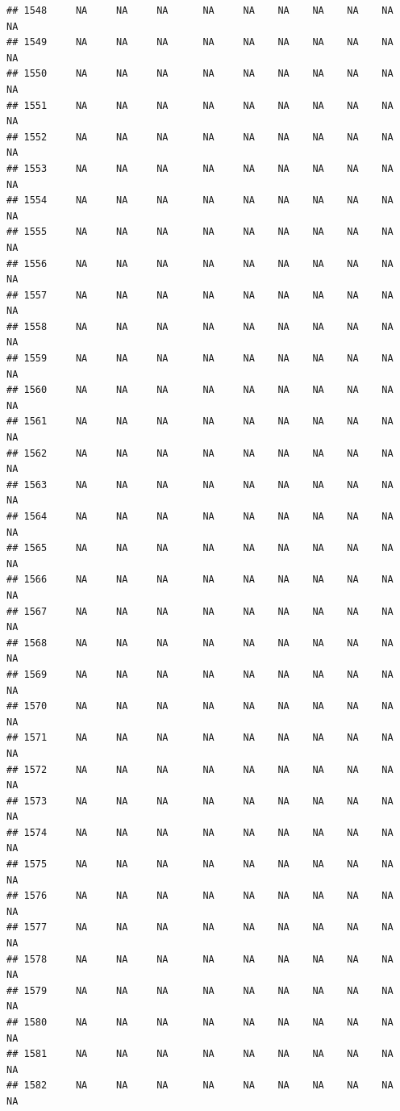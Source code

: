 \documentclass{article}\usepackage{graphicx, color}
\makeatletter
\newenvironment{kframe}{%
 \def\at@end@of@kframe{}%
 \ifinner\ifhmode%
  \def\at@end@of@kframe{\end{minipage}}%
  \begin{minipage}{\columnwidth}%
 \fi\fi%
 \def\FrameCommand##1{\hskip\@totalleftmargin \hskip-\fboxsep
 \colorbox{shadecolor}{##1}\hskip-\fboxsep
     \hskip-\linewidth \hskip-\@totalleftmargin \hskip\columnwidth}%
 \MakeFramed {\advance\hsize-\width
   \@totalleftmargin\z@ \linewidth\hsize
   \@setminipage}}%
 {\par\unskip\endMakeFramed%
 \at@end@of@kframe}
\newenvironment{knitrout}{}{} %
\makeatother
\begin{document}
\begin{knitrout}
\begin{kframe}
\begin{verbatim}
## 1548     NA     NA     NA      NA     NA    NA    NA    NA    NA     NA
## 1549     NA     NA     NA      NA     NA    NA    NA    NA    NA     NA
## 1550     NA     NA     NA      NA     NA    NA    NA    NA    NA     NA
## 1551     NA     NA     NA      NA     NA    NA    NA    NA    NA     NA
## 1552     NA     NA     NA      NA     NA    NA    NA    NA    NA     NA
## 1553     NA     NA     NA      NA     NA    NA    NA    NA    NA     NA
## 1554     NA     NA     NA      NA     NA    NA    NA    NA    NA     NA
## 1555     NA     NA     NA      NA     NA    NA    NA    NA    NA     NA
## 1556     NA     NA     NA      NA     NA    NA    NA    NA    NA     NA
## 1557     NA     NA     NA      NA     NA    NA    NA    NA    NA     NA
## 1558     NA     NA     NA      NA     NA    NA    NA    NA    NA     NA
## 1559     NA     NA     NA      NA     NA    NA    NA    NA    NA     NA
## 1560     NA     NA     NA      NA     NA    NA    NA    NA    NA     NA
## 1561     NA     NA     NA      NA     NA    NA    NA    NA    NA     NA
## 1562     NA     NA     NA      NA     NA    NA    NA    NA    NA     NA
## 1563     NA     NA     NA      NA     NA    NA    NA    NA    NA     NA
## 1564     NA     NA     NA      NA     NA    NA    NA    NA    NA     NA
## 1565     NA     NA     NA      NA     NA    NA    NA    NA    NA     NA
## 1566     NA     NA     NA      NA     NA    NA    NA    NA    NA     NA
## 1567     NA     NA     NA      NA     NA    NA    NA    NA    NA     NA
## 1568     NA     NA     NA      NA     NA    NA    NA    NA    NA     NA
## 1569     NA     NA     NA      NA     NA    NA    NA    NA    NA     NA
## 1570     NA     NA     NA      NA     NA    NA    NA    NA    NA     NA
## 1571     NA     NA     NA      NA     NA    NA    NA    NA    NA     NA
## 1572     NA     NA     NA      NA     NA    NA    NA    NA    NA     NA
## 1573     NA     NA     NA      NA     NA    NA    NA    NA    NA     NA
## 1574     NA     NA     NA      NA     NA    NA    NA    NA    NA     NA
## 1575     NA     NA     NA      NA     NA    NA    NA    NA    NA     NA
## 1576     NA     NA     NA      NA     NA    NA    NA    NA    NA     NA
## 1577     NA     NA     NA      NA     NA    NA    NA    NA    NA     NA
## 1578     NA     NA     NA      NA     NA    NA    NA    NA    NA     NA
## 1579     NA     NA     NA      NA     NA    NA    NA    NA    NA     NA
## 1580     NA     NA     NA      NA     NA    NA    NA    NA    NA     NA
## 1581     NA     NA     NA      NA     NA    NA    NA    NA    NA     NA
## 1582     NA     NA     NA      NA     NA    NA    NA    NA    NA     NA

\end{verbatim}
\end{kframe}
\end{knitrout}
\end{document}
